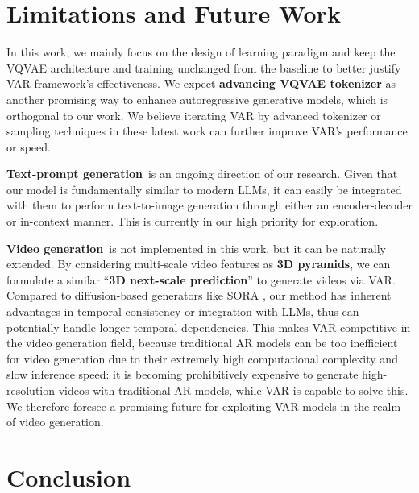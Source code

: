 \section{Limitations and Future Work} \label{sec:limit}
\vspace{-2pt}

In this work, we mainly focus on the design of learning paradigm and keep the VQVAE architecture and training unchanged from the baseline \cite{vqgan} to better justify VAR framework's effectiveness. We expect \textbf{advancing VQVAE tokenizer} \cite{movq,fsq,magvit2} as another promising way to enhance autoregressive generative models, which is orthogonal to our work. We believe iterating VAR by advanced tokenizer or sampling techniques in these latest work can further improve VAR's performance or speed.

\textbf{Text-prompt generation}\, is an ongoing direction of our research. Given that our model is fundamentally similar to modern LLMs, it can easily be integrated with them to perform text-to-image generation through either an encoder-decoder or in-context manner. This is currently in our high priority for exploration.

\textbf{Video generation}\, is not implemented in this work, but it can be naturally extended. By considering multi-scale video features as \textbf{3D pyramids}, we can formulate a similar ``\textbf{3D next-scale prediction}'' to generate videos via VAR.
Compared to diffusion-based generators like SORA \cite{sora}, our method has inherent advantages in temporal consistency or integration with LLMs, thus can potentially handle longer temporal dependencies.
This makes VAR competitive in the video generation field, because traditional AR models can be too inefficient for video generation due to their extremely high computational complexity and slow inference speed: it is becoming prohibitively expensive to generate high-resolution videos with traditional AR models, while VAR is capable to solve this.
We therefore foresee a promising future for exploiting VAR models in the realm of video generation.


\vspace{-4pt}
\section{Conclusion} \label{sec:conc}
\vspace{-4pt}

